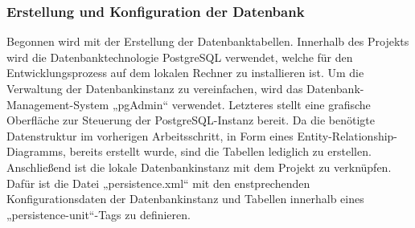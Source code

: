 \documentclass[11pt]{article}
\begin{document}
    \subsubsection{Erstellung und Konfiguration der Datenbank}
    Begonnen wird mit der Erstellung der Datenbanktabellen. Innerhalb des Projekts wird die Datenbanktechnologie PostgreSQL verwendet, 
    welche für den Entwicklungsprozess auf dem lokalen Rechner zu installieren ist. Um die Verwaltung der Datenbankinstanz zu vereinfachen,
    wird das Datenbank-Management-System „pgAdmin“ verwendet. Letzteres stellt eine grafische Oberfläche zur Steuerung der PostgreSQL-Instanz bereit.
    Da die benötigte Datenstruktur im vorherigen Arbeitsschritt, in Form eines Entity-Relationship-Diagramms, bereits erstellt wurde, sind die Tabellen lediglich zu erstellen.
    Anschließend ist die lokale Datenbankinstanz mit dem Projekt zu verknüpfen. Dafür ist die Datei „persistence.xml“ mit den enstprechenden Konfigurationsdaten 
    der Datenbankinstanz und Tabellen innerhalb eines „persistence-unit“-Tags zu definieren.
    
    \newpage
\end{document}
